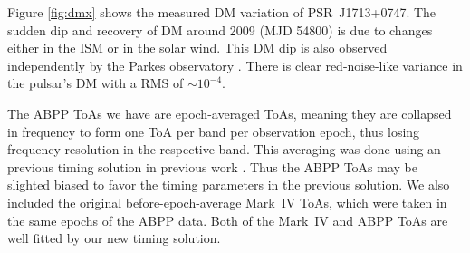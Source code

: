 
Figure \ref{fig:dmx} shows the measured DM variation of PSR~J1713+0747.
The sudden dip and recovery of DM around 2009 (MJD 54800) is 
due to changes either in the ISM or in the solar wind. This DM dip is also
observed independently by the Parkes observatory \citep{kcs+13}.
There is clear red-noise-like variance in the pulsar's DM with a RMS of
$\sim10^{-4}$. 


The ABPP ToAs we have are epoch-averaged ToAs, meaning they are collapsed in frequency to form one ToA per band per observation epoch, thus losing frequency resolution in the respective band. 
This averaging was done using an previous timing solution in previous work
\citep{sns+05}. Thus the ABPP ToAs may be slighted biased to favor the
timing parameters in the previous solution. We also included the original
before-epoch-average Mark~IV ToAs, which were taken in the same epochs of the
ABPP data. Both of the Mark~IV and ABPP  ToAs are well fitted by our new
timing solution.

